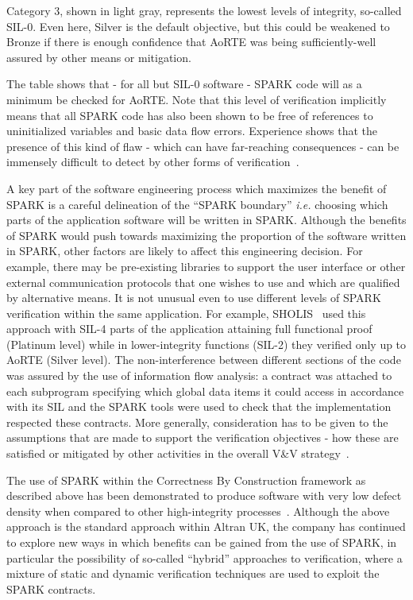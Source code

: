 \documentclass{eceasst}
\newcommand{\ie}{\textit{i.e.}\xspace}
\begin{document}
Category 3, shown in light gray, represents the lowest levels of integrity,
so-called SIL-0. Even here, Silver is the default objective,
but this could be weakened to Bronze if there is enough confidence
that AoRTE was being sufficiently-well assured by other means or mitigation.

The table shows that - for all but SIL-0 software - SPARK code will as a
minimum be checked for AoRTE. Note that this level of verification implicitly
means that all SPARK code has also been shown to be free of references to
uninitialized variables and basic data flow errors.  Experience shows that the
presence of this kind of flaw - which can have far-reaching consequences - can
be immensely difficult to detect by other forms of
verification~\cite{King2000TSE}.

A key part of the software engineering process which maximizes the benefit of
SPARK is a careful delineation of the ``SPARK boundary'' \ie choosing which
parts of the application software will be written in SPARK. Although the
benefits of SPARK would push towards maximizing the proportion of the software
written in SPARK, other factors are likely to affect this engineering
decision. For example, there may be pre-existing libraries to support the user
interface or other external communication protocols that one wishes to use and
which are qualified by alternative means. It is not unusual even to use
different levels of SPARK verification within the same application. For example,
SHOLIS~\cite{Croxford2005Manifesto} used this approach with SIL-4 parts of the
application attaining full functional proof (Platinum level) while in
lower-integrity functions (SIL-2) they verified only up to AoRTE (Silver level).
The non-interference between different sections of the code was assured by the
use of information flow analysis: a contract was attached to each subprogram
specifying which global data items it could access in accordance with its SIL
and the SPARK tools were used to check that the implementation respected these
contracts. More generally, consideration has to be given to the assumptions
that are made to support the verification objectives - how these are satisfied
or mitigated by other activities in the overall V\&V
strategy~\cite{kanig2014tap}.

The use of SPARK within the Correctness By Construction framework as described
above has been demonstrated to produce software with very low defect density
when compared to other high-integrity
processes~\cite{Croxford2005Manifesto}. Although the above approach is the
standard approach within Altran UK, the company has continued to explore new ways in
which benefits can be gained from the use of SPARK, in particular the
possibility of so-called ``hybrid'' approaches to verification, where a mixture
of static and dynamic verification techniques are used to exploit the SPARK
contracts.
\end{document}
